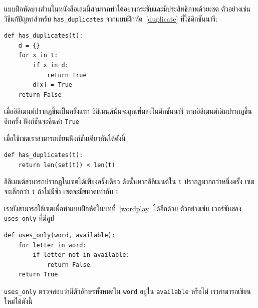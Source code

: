 
แบบฝึกหัดบางส่วนในหนังสือเล่มนี้สามารถทำได้อย่างกระชับและมีประสิทธิภาพด้วยเซต ตัวอย่างเช่น วิธีแก้ปัญหาสำหรับ \verb"has_duplicates" 
จากแบบฝึกหัด~\ref{duplicate} ที่ใช้ดิกชันนารี:

\begin{verbatim}
def has_duplicates(t):
    d = {}
    for x in t:
        if x in d:
            return True
        d[x] = True
    return False
\end{verbatim}

เมื่ออิลิเมนต์ปรากฏขึ้นเป็นครั้งแรก อิลิเมนต์นั้นจะถูกเพิ่มลงในดิกชันนารี  หากอิลิเมนต์เดิมปรากฏขึ้นอีกครั้ง ฟังก์ชันจะคืนค่า {\tt True}

เมื่อใช้เซตเราสามารถเขียนฟังก์ชันเดียวกันได้ดังนี้

\begin{verbatim}
def has_duplicates(t):
    return len(set(t)) < len(t)
\end{verbatim}
%
อิลิเมนต์สามารถปรากฏในเซตได้เพียงครั้งเดียว ดังนั้นหากอิลิเมนต์ใน {\tt t} ปรากฏมากกว่าหนึ่งครั้ง เซตจะเล็กกว่า {\tt t} ถ้าไม่มีซ้ำ เซตจะมีขนาดเท่ากับ {\tt t}

เรายังสามารถใช้เซตเพื่อทำแบบฝึกหัดในบทที่~\ref{wordplay} ได้อีกด้วย ตัวอย่างเช่น เวอร์ชันของ \verb"uses_only" ที่มีลูป

\begin{verbatim}
def uses_only(word, available):
    for letter in word: 
        if letter not in available:
            return False
    return True
\end{verbatim}
%
\verb"uses_only" ตรวจสอบว่ามีตัวอักษรทั้งหมดใน {\tt word} อยู่ใน {\tt available} หรือไม่ เราสามารถเขียนใหม่ได้ดังนี้


